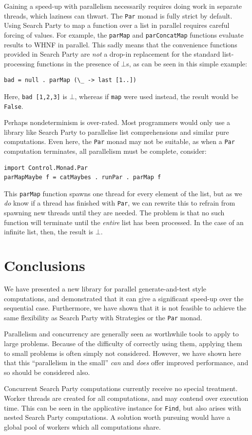 Gaining a speed-up with parallelism necessarily requires doing work in
separate threads, which laziness can thwart. The \verb|Par| monad is
fully strict by default. Using Search Party to map a function over a
list in parallel requires careful forcing of values. For example, the
\verb|parMap| and \verb|parConcatMap| functions evaluate results to
WHNF in parallel. This sadly means that the convenience functions
provided in Search Party are \textit{not} a drop-in replacement for
the standard list-processing functions in the presence of $\bot$s, as
can be seen in this simple example:

\begin{verbatim}
bad = null . parMap (\_ -> last [1..])
\end{verbatim}

Here, \verb|bad [1,2,3]| is $\bot$, whereas if \verb|map| were used
instead, the result would be \verb|False|.

Perhaps nondeterminism is over-rated. Most programmers would only use
a library like Search Party to parallelise list comprehensions and
similar pure computations. Even here, the \verb|Par| monad may not be
suitable, as when a \verb|Par| computation terminates, all parallelism
must be complete, consider:

\begin{verbatim}
import Control.Monad.Par
parMapMaybe f = catMaybes . runPar . parMap f
\end{verbatim}

This \verb|parMap| function spawns one thread for every element of the
list, but as we \textit{do} know if a thread has finished with
\verb|Par|, we can rewrite this to refrain from spawning new threads
until they are needed. The problem is that no such function will
terminate until the \textit{entire} list has been processed. In the
case of an infinite list, then, the result is $\bot$.

\section{Conclusions}
\label{sec:searchparty-concs}

We have presented a new library for parallel generate-and-test style
computations, and demonstrated that it can give a significant speed-up
over the sequential case. Furthermore, we have shown that it is not
feasible to achieve the same flexibility as Search Party with
Strategies or the \verb|Par| monad.

Parallelism and concurrency are generally seen as worthwhile tools to
apply to large problems. Because of the difficulty of correctly using
them, applying them to small problems is often simply not
considered. However, we have shown here that this ``parallelism in the
small'' \textit{can} and \textit{does} offer improved performance, and
so should be considered also.

Concurrent Search Party computations currently receive no special
treatment. Worker threads are created for all computations, and may
contend over execution time. This can be seen in the applicative
instance for \verb|Find|, but also arises with nested Search Party
computations. A solution worth pursuing would have a global pool of
workers which all computations share.
